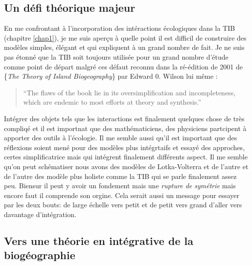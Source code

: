 \subsection*{Un défi théorique
majeur}\label{un-duxe9fi-thuxe9orique-majeur}

En me confrontant à l'incorporation des intéractions écologiques dans la
TIB (chapitre \ref{chap1}), je me suis aperçu à quelle point il est
difficil de construire des modèles simples, élégant et qui expliquent à
un grand nombre de fait. Je ne suis pas étonné que la TIB soit toujours
utilisée pour un grand nombre d'étude comme point de départ malgré ces
défaut reconnu dans la ré-édition de 2001 de \{\emph{The Theory of
Island Biogeography}\} par Edward 0. Wilson lui même :

\begin{quote}
``The flaws of the book lie in its oversimplification and
incompleteness, which are endemic to most efforts at theory and
synthesis.''
\end{quote}

Intégrer des objets tels que les interactions est finalement quelques
chose de très compliqé et il est importnat que des mathématiciens, des
physiciens partcipent à apporter des outils à l'écologie. Il me semble
aussi qu'il est important que des réflexions soient mené pour des
modèles plus intégrtaifs et essayé des approches, certes simplificatrice
mais qui intégrent finalement différents aspect. Il me semble qu'on peut
schématiser nous avons des modèles de Lotka-Volterra et de l'autre et de
l'autre des modèle plus holiste comme la TIB qui se parle finalement
assez peu. Biensur il peut y avoir un fondement mais une \emph{rupture
de symétrie} mais encore faut il comprende son orgine. Cela serait aussi
un message pour essayer par les deux bouts: de large échelle vers petit
et de petit vers grand d'aller vers davantage d'intégration.

\subsection*{Vers une théorie en intégrative de la
biogéographie}\label{vers-une-thuxe9orie-en-intuxe9grative-de-la-bioguxe9ographie}

